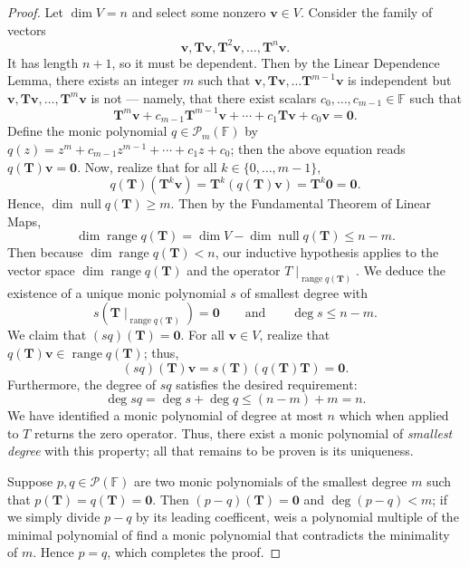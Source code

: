 \documentclass[11pt]{article}
\renewcommand{\vec}[1]{\mathbf{#1}}
\newcommand{\mat}[1]{\mathbf{#1}}
\newcommand{\nll}{\operatorname{null}}
\newcommand{\range}{\operatorname{range}}
\begin{document}
\begin{adjustwidth}{1cm}{}
\begin{proof}
		Let $\dim V = n$ and select some nonzero $\vec{v} \in V$. Consider the family of vectors
		\[
			\vec{v}, \mat{T} \vec{v}, \mat{T}^{2} \vec{v}, \ldots, \mat{T}^{n} \vec{v}.
		\]
		It has length $n + 1$, so it must be dependent. Then by the Linear Dependence Lemma, there exists an integer $m$ such that $\vec{v}, \mat{T} \vec{v}, \ldots \mat{T}^{m - 1} \vec{v}$ is independent but $\vec{v}, \mat{T} \vec{v}, \ldots, \mat{T}^{m} \vec{v}$ is not --- namely, that there exist scalars $c_{0}, \ldots, c_{m - 1} \in \mathbb{F}$ such that
		\[
			\mat{T}^{m} \vec{v} + c_{m - 1} \mat{T}^{m - 1} \vec{v} + \cdots + c_{1} \mat{T} \vec{v} + c_{0} \vec{v} = \vec{0}.
		\]
		Define the monic polynomial $q \in \mathcal{P}_{m}(\mathbb{F})$ by $q(z) = z^{m} + c_{m - 1}z^{m - 1} + \cdots + c_{1}z + c_{0}$; then the above equation reads $q(\mat{T}) \vec{v} = \vec{0}$. Now, realize that for all $k \in \{ 0, \ldots, m - 1 \}$,
		\[
			q(\mat{T}) (\mat{T}^{k} \vec{v}) = \mat{T}^{k} (q(\mat{T}) \vec{v}) = \mat{T}^{k} \vec{0} = \vec{0}.
		\]
		Hence, $\dim \nll q(\mat{T}) \ge m$. Then by the Fundamental Theorem of Linear Maps,
		\[
			\dim \range q(\mat{T}) = \dim V - \dim \nll q(\mat{T}) \le n - m.
		\]
		Then because $\dim \range q(\mat{T}) < n$, our inductive hypothesis applies to the vector space $\dim \range q(\mat{T})$ and the operator $T \mid_{\range q(\mat{T})}$. We deduce the existence of a unique monic polynomial $s$ of smallest degree with 
		\[
			s(\mat{T} \mid_{\range q(\mat{T})}) = \mat{0} \qquad \text{and} \qquad \deg s \le n - m.
		\]
		We claim that $(sq)(\mat{T}) = \mat{0}$. For all $\vec{v} \in V$, realize that $q(\mat{T}) \vec{v} \in \range q(\mat{T})$; thus, 
		\[
			(sq)(\mat{T}) \vec{v} = s(\mat{T}) (q(\mat{T}) \vec{T}) = \vec{0}.
		\]
		Furthermore, the degree of $sq$	satisfies the desired requirement:
		\[
			\deg sq = \deg s + \deg q \le (n - m) + m = n.
		\]
		We have identified a monic polynomial of degree at most $n$ which when applied to $T$ returns the zero operator. Thus, there exist a monic polynomial of \textit{smallest degree} with this property; all that remains to be proven is its uniqueness.

		Suppose $p, q \in \mathcal{P}(\mathbb{F})$ are two monic polynomials of the smallest degree $m$ such that $p(\mat{T}) = q(\mat{T}) = \mat{0}$. Then $(p - q)(\mat{T}) = \mat{0}$ and $\deg(p - q) < m$; if we simply divide $p - q$ by its leading coefficent, weis a polynomial multiple of the minimal polynomial of find a monic polynomial that contradicts the minimality of $m$. Hence $p = q$, which completes the proof.
	\end{proof}
\end{adjustwidth}
 
\end{document}
